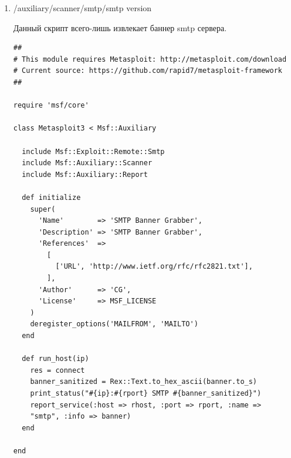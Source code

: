 \documentclass{article}
\begin{document}
\begin{enumerate}
\begin{verbatim}
        print_good "#{ip}:#{rport} - LOGIN SUCCESSFUL: 
        #{result.credential}"
      else
        invalidate_login(credential_data)
        vprint_error "#{ip}:#{rport} - LOGIN FAILED: 
        #{result.credential} (#{result.status}: #{result.proof})"
      end
    end

  end


  # Always check for anonymous access by pretending to be a 
  browser.
  def anonymous_creds
    anon_creds = [ ]
    if datastore['RECORD_GUEST']
      ['IEUser@', 'User@', 'mozilla@example.com', 
      'chrome@example.com' ].each do |password|
        anon_creds << 
        Metasploit::Framework::Credential.new(public: 
        'anonymous', private: password)
      end
    end
    anon_creds
  end

  def test_ftp_access(user,scanner)
    dir = Rex::Text.rand_text_alpha(8)
    write_check = scanner.send_cmd(['MKD', dir], true)
    if write_check and write_check =~ /^2/
      scanner.send_cmd(['RMD',dir], true)
      print_status("#{rhost}:#{rport} - User '#{user}' has READ/
      WRITE access")
      return 'Read/Write'
    else
      print_status("#{rhost}:#{rport} - User '#{user}' has READ 
      access")
      return 'Read-only'
    end
  end
end
\end{verbatim}

\item /auxiliary/scanner/smtp/smtp version

Данный скрипт всего-лишь извлекает баннер smtp сервера.

\begin{verbatim}
##
# This module requires Metasploit: http://metasploit.com/download
# Current source: https://github.com/rapid7/metasploit-framework
##

require 'msf/core'

class Metasploit3 < Msf::Auxiliary

  include Msf::Exploit::Remote::Smtp
  include Msf::Auxiliary::Scanner
  include Msf::Auxiliary::Report

  def initialize
    super(
      'Name'        => 'SMTP Banner Grabber',
      'Description' => 'SMTP Banner Grabber',
      'References'  =>
        [
          ['URL', 'http://www.ietf.org/rfc/rfc2821.txt'],
        ],
      'Author'      => 'CG',
      'License'     => MSF_LICENSE
    )
    deregister_options('MAILFROM', 'MAILTO')
  end

  def run_host(ip)
    res = connect
    banner_sanitized = Rex::Text.to_hex_ascii(banner.to_s)
    print_status("#{ip}:#{rport} SMTP #{banner_sanitized}")
    report_service(:host => rhost, :port => rport, :name => 
    "smtp", :info => banner)
  end

end
\end{verbatim}

\end{enumerate}
\end{document}
